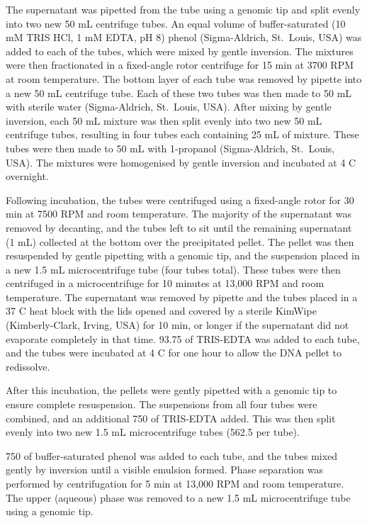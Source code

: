The supernatant was pipetted from the tube using a genomic tip and split evenly into two new 50 mL centrifuge tubes.
An equal volume of buffer-saturated (10 mM TRIS HCl, 1 mM EDTA, pH 8) phenol (Sigma-Aldrich, St.\ Louis, USA) was added to each of the tubes, which were mixed by gentle inversion.
The mixtures were then fractionated in a fixed-angle rotor centrifuge for 15 min at 3700 RPM at room temperature.
The bottom layer of each tube was removed by pipette into a new 50 mL centrifuge tube.
Each of these two tubes was then made to 50 mL with sterile water (Sigma-Aldrich, St.\ Louis, USA).
After mixing by gentle inversion, each 50 mL mixture was then split evenly into two new 50 mL centrifuge tubes, resulting in four tubes each containing 25 mL of mixture.
These tubes were then made to 50 mL with 1-propanol (Sigma-Aldrich, St.\ Louis, USA).
The mixtures were homogenised by gentle inversion and incubated at 4 \textdegree{}C overnight.

Following incubation, the tubes were centrifuged using a fixed-angle rotor for 30 min at 7500 RPM and room temperature.
The majority of the supernatant was removed by decanting, and the tubes left to sit until the remaining supernatant (\textapprox{}1 mL) collected at the bottom over the precipitated pellet.
The pellet was then resuspended by gentle pipetting with a genomic tip, and the suspension placed in a new 1.5 mL microcentrifuge tube (four tubes total).
These tubes were then centrifuged in a microcentrifuge for 10 minutes at 13,000 RPM and room temperature.
The supernatant was removed by pipette and the tubes placed in a 37 \textdegree{}C heat block with the lids opened and covered by a sterile KimWipe (Kimberly-Clark, Irving, USA) for 10 min, or longer if the supernatant did not evaporate completely in that time.
93.75 \microlitre{} of TRIS-EDTA was added to each tube, and the tubes were incubated at 4 \textdegree{}C for one hour to allow the DNA pellet to redissolve.

After this incubation, the pellets were gently pipetted with a genomic tip to ensure complete resuspension.
The suspensions from all four tubes were combined, and an additional 750 \microlitre{} of TRIS-EDTA added.
This was then split evenly into two new 1.5 mL microcentrifuge tubes (\textapprox{}562.5 \microlitre{} per tube).

750 \microlitre{} of buffer-saturated phenol was added to each tube, and the tubes mixed gently by inversion until a visible emulsion formed.
Phase separation was performed by centrifugation for 5 min at 13,000 RPM and room temperature.
The upper (aqueous) phase was removed to a new 1.5 mL microcentrifuge tube using a genomic tip.

